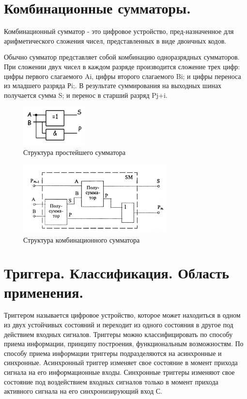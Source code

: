 \documentclass[unicode, 12pt, a4paper, oneside]{article}
\begin{document}
\section{Комбинационные сумматоры.}

Комбинационный сумматор - это цифровое устройство, пред-назначенное для арифметического сложения чисел, представленных в виде двоичных кодов.

Обычно сумматор представляет собой комбинацию одноразрядных сумматоров. При сложении двух чисел в каждом разряде производится сложение трех цифр: цифры первого слагаемого Ai, цифры второго слагаемого Bi; и цифры переноса из младшего разряда Рi;. В результате суммирования на выходных шинах получается сумма S; и перенос в старший разряд Pj+i.

\begin{figure}[H]
\centering
\includegraphics[width=0.3\textwidth]{12_additor.jpg}
\caption{Структура простейшего сумматора}
\label{fig:12_additor}
\end{figure}

\begin{figure}[H]
\centering
\includegraphics[width=0.7\textwidth]{12_cs.jpg}
\caption{Структура комбинационного сумматора}
\label{fig:12_cs}
\end{figure}


\section{Триггера. Классификация. Область применения.}

Триггером называется цифровое устройство, которое может находиться в одном из двух устойчивых состояний и переходит из одного состояния в другое под действием входных сигналов. Триггеры можно классифицировать по способу приема информации, принципу построения, функциональным возможностям. По способу приема информации триггеры подразделяются на асинхронные и синхронные. Асинхронный триггер изменяет свое состояние в момент прихода сигнала на его информационные входы. Синхронные триггеры изменяют свое состояние под воздействием входных сигналов только в момент прихода активного сигнала на его синхронизирующий вход С.
\end{document}
